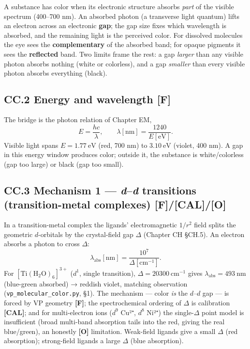 \documentclass[
  10pt,
]{article}
\begin{document}
A substance has color when its electronic structure absorbs \emph{part}
of the visible spectrum (400--700 nm). An absorbed photon (a transverse
light quantum) lifts an electron across an electronic \textbf{gap}; the
gap size fixes which wavelength is absorbed, and the remaining light is
the perceived color. For dissolved molecules the eye sees the
\textbf{complementary} of the absorbed band; for opaque pigments it sees
the \textbf{reflected} band. Two limits frame the rest: a gap
\emph{larger} than any visible photon absorbs nothing (white or
colorless), and a gap \emph{smaller} than every visible photon absorbs
everything (black).

\hypertarget{cc.2-energy-and-wavelength-f}{%
\subsection{\texorpdfstring{CC.2 Energy and wavelength
\textbf{{[}F{]}}}{CC.2 Energy and wavelength {[}F{]}}}\label{cc.2-energy-and-wavelength-f}}

The bridge is the photon relation of Chapter EM,
\[ E = \frac{hc}{\lambda}, \qquad \lambda[\mathrm{nm}] = \frac{1240}{E[\mathrm{eV}]}. \]
Visible light spans \(E = 1.77\ \mathrm{eV}\) (red, 700 nm) to
\(3.10\ \mathrm{eV}\) (violet, 400 nm). A gap in this energy window
produces color; outside it, the substance is white/colorless (gap too
large) or black (gap too small).

\hypertarget{cc.3-mechanism-1-dd-transitions-transition-metal-complexes-fcalo}{%
\subsection{\texorpdfstring{CC.3 Mechanism 1 --- \emph{d}--\emph{d}
transitions (transition-metal complexes)
\textbf{{[}F{]}/{[}CAL{]}/{[}O{]}}}{CC.3 Mechanism 1 --- d--d transitions (transition-metal complexes) {[}F{]}/{[}CAL{]}/{[}O{]}}}\label{cc.3-mechanism-1-dd-transitions-transition-metal-complexes-fcalo}}

In a transition-metal complex the ligands' electromagnetic \(1/r^2\)
field splits the geometric \(d\)-orbitals by the crystal-field gap
\(\Delta\) (Chapter CH §CH.5). An electron absorbs a photon to cross
\(\Delta\):
\[ \lambda_{\text{abs}}[\mathrm{nm}] = \frac{10^7}{\Delta[\mathrm{cm}^{-1}]}. \]
For \([\mathrm{Ti}(\mathrm H_2\mathrm O)_6]^{3+}\) (\(d^1\), single
transition), \(\Delta = 20300\
\mathrm{cm^{-1}}\) gives \(\lambda_{\text{abs}} = 493\ \mathrm{nm}\)
(blue-green absorbed) → reddish violet, matching observation
(\texttt{vp\_molecular\_color.py}, §1). The mechanism --- color
\emph{is} the \(d\)--\(d\) gap --- is forced by VP geometry
\textbf{{[}F{]}}; the spectrochemical ordering of \(\Delta\) is
calibration \textbf{{[}CAL{]}}; and for multi-electron ions (\(d^9\)
Cu²⁺, \(d^8\) Ni²⁺) the single-\(\Delta\) point model is insufficient
(broad multi-band absorption tails into the red, giving the real
blue/green), an honestly \textbf{{[}O{]}} limitation. Weak-field ligands
give a small \(\Delta\) (red absorption); strong-field ligands a large
\(\Delta\) (blue absorption).
\end{document}
